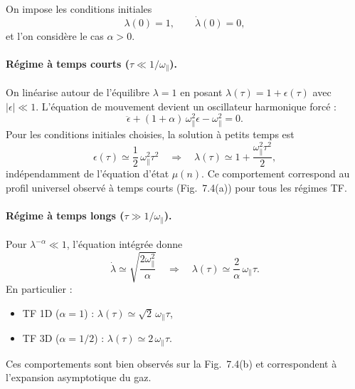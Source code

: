 On impose les conditions initiales
\[
\lambda(0)=1, \qquad \dot\lambda(0)=0,
\]
et l'on considère le cas \(\alpha>0\).

\paragraph{Régime à temps courts (\(\tau \ll 1/\omega_\parallel\)).}  
On linéarise autour de l'équilibre \(\lambda=1\) en posant \(\lambda(\tau)=1+\epsilon(\tau)\) avec \(|\epsilon|\ll 1\). L'équation de mouvement devient un oscillateur harmonique forcé :
\[
\ddot \epsilon + (1+\alpha)\,\omega_\parallel^2 \epsilon - \omega_\parallel^2 = 0.
\]
Pour les conditions initiales choisies, la solution à petits temps est
\[
\epsilon(\tau) \simeq \frac{1}{2}\,\omega_\parallel^2 \tau^2 \quad\Rightarrow\quad
\lambda(\tau) \simeq 1 + \frac{\omega_\parallel^2 \tau^2}{2},
\]
indépendamment de l'équation d'état \(\mu(n)\). Ce comportement correspond au profil universel observé à temps courts (Fig.~7.4(a)) pour tous les régimes TF.

\paragraph{Régime à temps longs (\(\tau \gg 1/\omega_\parallel\)).}  
Pour \(\lambda^{-\alpha}\ll 1\), l'équation intégrée donne
\[
\dot\lambda \simeq \sqrt{\frac{2\omega_\parallel^2}{\alpha}} \quad\Rightarrow\quad
\lambda(\tau) \simeq \frac{2}{\alpha}\,\omega_\parallel \tau.
\]
En particulier :
\begin{itemize}
\item TF 1D (\(\alpha=1\)) : \(\lambda(\tau)\simeq \sqrt{2}\,\omega_\parallel \tau\),  
\item TF 3D (\(\alpha=1/2\)) : \(\lambda(\tau)\simeq 2\,\omega_\parallel \tau\).  
\end{itemize}
Ces comportements sont bien observés sur la Fig.~7.4(b) et correspondent à l’expansion asymptotique du gaz.





